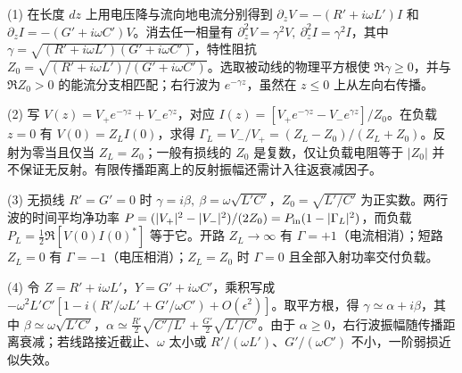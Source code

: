 (1) 在长度 \(dz\) 上用电压降与流向地电流分别得到 \(\partial_z V=-(R'+i\omega L')I\) 和 \(\partial_z I=-(G'+i\omega C')V\)。消去任一相量有 \(\partial_z^2V=\gamma^2V,\ \partial_z^2I=\gamma^2I\)，其中 \(\gamma=\sqrt{(R'+i\omega L')(G'+i\omega C')}\)，特性阻抗 \(Z_0=\sqrt{(R'+i\omega L')/(G'+i\omega C')}\)。选取被动线的物理平方根使 \(\Re\gamma\ge0\)，并与 \(\Re Z_0>0\) 的能流分支相匹配；右行波为 \(e^{-\gamma z}\)，虽然在 \(z\le0\) 上从左向右传播。

(2) 写 \(V(z)=V_+e^{-\gamma z}+V_-e^{\gamma z}\)，对应 \(I(z)=[V_+e^{-\gamma z}-V_-e^{\gamma z}]/Z_0\)。在负载 \(z=0\) 有 \(V(0)=Z_LI(0)\)，求得 \(\Gamma_L=V_-/V_+=(Z_L-Z_0)/(Z_L+Z_0)\)。反射为零当且仅当 \(Z_L=Z_0\)；一般有损线的 \(Z_0\) 是复数，仅让负载电阻等于 \(|Z_0|\) 并不保证无反射。有限传播距离上的反射振幅还需计入往返衰减因子。

(3) 无损线 \(R'=G'=0\) 时 \(\gamma=i\beta,\ \beta=\omega\sqrt{L'C'}\)，\(Z_0=\sqrt{L'/C'}\) 为正实数。两行波的时间平均净功率 \(P=(|V_+|^2-|V_-|^2)/(2Z_0)=P_{\rm in}(1-|\Gamma_L|^2)\)，而负载 \(P_L=\frac12\Re[V(0)I(0)^*]\) 等于它。开路 \(Z_L\to\infty\) 有 \(\Gamma=+1\)（电流相消）；短路 \(Z_L=0\) 有 \(\Gamma=-1\)（电压相消）；\(Z_L=Z_0\) 时 \(\Gamma=0\) 且全部入射功率交付负载。

(4) 令 \(Z=R'+i\omega L'\)，\(Y=G'+i\omega C'\)，乘积写成 \(-\omega^2L'C'[1-i(R'/\omega L'+G'/\omega C')+O(\epsilon^2)]\)。取平方根，得 \(\gamma\simeq\alpha+i\beta\)，其中 \(\beta\simeq\omega\sqrt{L'C'}\)，\(\alpha\simeq\frac{R'}2\sqrt{C'/L'}+\frac{G'}2\sqrt{L'/C'}\)。由于 \(\alpha\ge0\)，右行波振幅随传播距离衰减；若线路接近截止、\(\omega\) 太小或 \(R'/(\omega L')\)、\(G'/(\omega C')\) 不小，一阶弱损近似失效。
